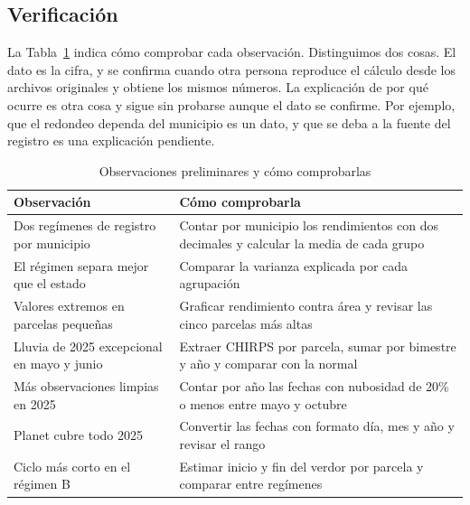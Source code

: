\subsection{Verificación}
La Tabla~\ref{tab:verificar} indica cómo comprobar cada observación. Distinguimos dos cosas. El dato es la cifra, y se confirma cuando otra persona reproduce el cálculo desde los archivos originales y obtiene los mismos números. La explicación de por qué ocurre es otra cosa y sigue sin probarse aunque el dato se confirme. Por ejemplo, que el redondeo dependa del municipio es un dato, y que se deba a la fuente del registro es una explicación pendiente.

\begin{table}[!t]
\caption{Observaciones preliminares y cómo comprobarlas}\label{tab:verificar}
\centering\footnotesize
\begin{tabularx}{\columnwidth}{@{}>{\raggedright\arraybackslash}p{3.3cm}X@{}}
\toprule
Observación & Cómo comprobarla \\
\midrule
Dos regímenes de registro por municipio & Contar por municipio los rendimientos con dos decimales y calcular la
  media de cada grupo \\
El régimen separa mejor que el estado & Comparar la varianza explicada por cada agrupación \\
Valores extremos en parcelas pequeñas & Graficar rendimiento contra área y revisar las cinco parcelas más altas \\
Lluvia de 2025 excepcional en mayo y junio & Extraer CHIRPS por parcela, sumar por bimestre y año y comparar con la normal \\
Más observaciones limpias en 2025 & Contar por año las fechas con nubosidad de 20\% o menos entre mayo y octubre \\
Planet cubre todo 2025 & Convertir las fechas con formato día, mes y año y revisar el rango \\
Ciclo más corto en el régimen B & Estimar inicio y fin del verdor por parcela y comparar entre regímenes \\
\bottomrule
\end{tabularx}
\end{table}
